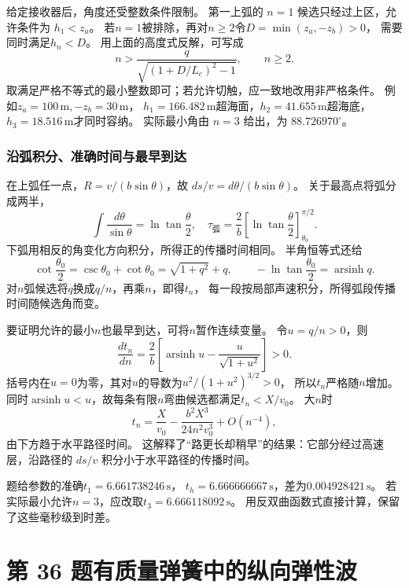 \documentclass[UTF8,fontset=fandol,a4paper,11pt]{ctexart}
\newcommand{\tagline}[1]{\noindent{\small\color{muted}#1}\par}
\begin{document}
给定接收器后，角度还受整数条件限制。
第一上弧的 $n=1$ 候选只经过上区，允许条件为 $h_1<z_a$。
若$n=1$被排除，再对$n\ge2$令$D=\min(z_a,-z_b)>0$，
需要同时满足$h_n<D$。
用上面的高度式反解，可写成
\[
n>\frac{q}{\sqrt{(1+D/L_c)^2-1}},\qquad n\ge2.
\]
取满足严格不等式的最小整数即可；若允许切触，应一致地改用非严格条件。
例如$z_a=100\,\mathrm m,-z_b=30\,\mathrm m$，
$h_1=166.482\,\mathrm m$超海面，$h_2=41.655\,\mathrm m$超海底，
$h_3=18.516\,\mathrm m$才同时容纳。
实际最小角由 $n=3$ 给出，为 $88.726970^\circ$。

\subsubsection*{沿弧积分、准确时间与最早到达}
在上弧任一点，$R=v/(b\sin\theta)$，故
$ds/v=d\theta/(b\sin\theta)$。
关于最高点将弧分成两半，
\[
\int\frac{d\theta}{\sin\theta}=\ln\tan\frac\theta2,
\quad\tau_{\text{弧}}=\frac2b
\left[\ln\tan\frac\theta2\right]_{\theta_0}^{\pi/2}.
\]
下弧用相反的角变化方向积分，所得正的传播时间相同。
半角恒等式还给
\[
\cot\frac{\theta_0}{2}
=\csc\theta_0+\cot\theta_0
=\sqrt{1+q^2}+q,\qquad
-\ln\tan\frac{\theta_0}{2}=\operatorname{arsinh}q.
\]
对$n$弧候选将$q$换成$q/n$，再乘$n$，即得$t_n$，
每一段按局部声速积分，所得弧段传播时间随候选角而变。

要证明允许的最小$n$也最早到达，可将$n$暂作连续变量。
令$u=q/n>0$，则
\[
\frac{dt_n}{dn}=\frac2b\left[
\operatorname{arsinh}u-\frac{u}{\sqrt{1+u^2}}\right]>0.
\]
括号内在$u=0$为零，其对$u$的导数为$u^2/(1+u^2)^{3/2}>0$，
所以$t_n$严格随$n$增加。
同时$\operatorname{arsinh}u<u$，故每条有限$n$弯曲候选都满足$t_n<X/v_0$。
大$n$时
\[
t_n=\frac X{v_0}-\frac{b^2X^3}{24n^2v_0^3}+O(n^{-4}),
\]
由下方趋于水平路径时间。
这解释了“路更长却稍早”的结果：它部分经过高速层，沿路径的 $ds/v$ 积分小于水平路径的传播时间。

题给参数的准确$t_1=6.661738246\,\mathrm s$，
$t_h=6.666666667\,\mathrm s$，差为$0.004928421\,\mathrm s$。
若实际最小允许$n=3$，应改取$t_3=6.666118092\,\mathrm s$。
用反双曲函数式直接计算，保留了这些毫秒级到时差。




\section*{第 36 题\quad 有质量弹簧中的纵向弹性波}

\tagline{M-07-36}
\end{document}
